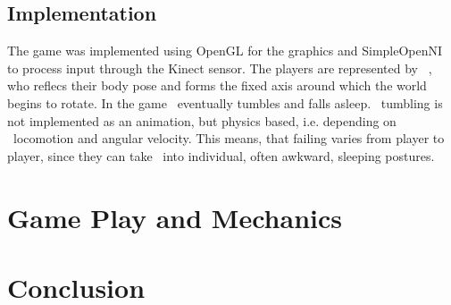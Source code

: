 \documentclass{chi-ext}
\begin{document}
\subsection{Implementation}
The game was implemented using OpenGL for the graphics and SimpleOpenNI to process input through the Kinect sensor. The players are represented by \ed\ , who reflecs their body pose and forms the fixed axis around which the world begins to rotate. In the game \ed\ eventually tumbles and falls asleep. \eds\ tumbling is not implemented as an animation, but physics based, i.e. depending on \eds\ locomotion and angular velocity. This means, that failing varies from player to player, since they can take \ed\ into individual, often awkward, sleeping postures.

\section{Game Play and Mechanics}
%
\section{Conclusion}


\end{document}
